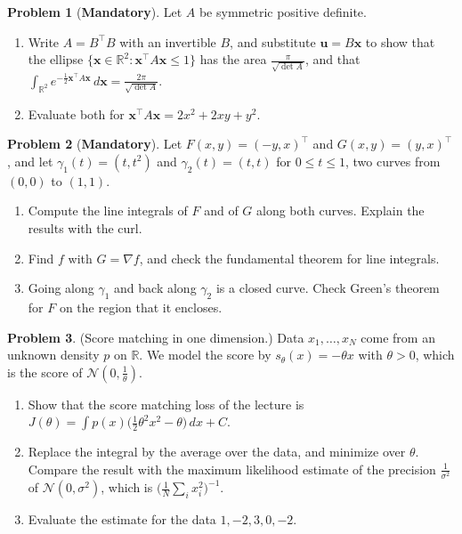 \documentclass[11pt]{article}
\theoremstyle{definition}
\newtheorem{problem}{Problem}[section]
\newcommand{\mandatory}{\textcolor{red!70!black}{\textbf{Mandatory}}}
\begin{document}
\begin{problem}[\mandatory]\label{pr:gauss-ellipse}
    Let $A$ be symmetric positive definite.
    \begin{enumerate}[label=(\alph*)]
        \item Write $A = B^\top B$ with an invertible $B$, and substitute $\mathbf{u} = B\mathbf{x}$ to show that the ellipse $\{\mathbf{x} \in \mathbb{R}^2 : \mathbf{x}^\top A\mathbf{x} \leq 1\}$ has the area $\frac{\pi}{\sqrt{\det A}}$, and that $\int_{\mathbb{R}^2} e^{-\frac{1}{2}\mathbf{x}^\top A\mathbf{x}}\, d\mathbf{x} = \frac{2\pi}{\sqrt{\det A}}$.
        \item Evaluate both for $\mathbf{x}^\top A\mathbf{x} = 2x^2 + 2xy + y^2$.
    \end{enumerate}
\end{problem}

\begin{problem}[\mandatory]\label{pr:line-integrals}
    Let $F(x, y) = (-y, x)^\top$ and $G(x, y) = (y, x)^\top$, and let $\gamma_1(t) = (t, t^2)$ and $\gamma_2(t) = (t, t)$ for $0 \leq t \leq 1$, two curves from $(0, 0)$ to $(1, 1)$.
    \begin{enumerate}[label=(\alph*)]
        \item Compute the line integrals of $F$ and of $G$ along both curves. Explain the results with the curl.
        \item Find $f$ with $G = \nabla f$, and check the fundamental theorem for line integrals.
        \item Going along $\gamma_1$ and back along $\gamma_2$ is a closed curve. Check Green's theorem for $F$ on the region that it encloses.
    \end{enumerate}
\end{problem}

\begin{problem}\label{pr:score-matching-1d}
    (Score matching in one dimension.) Data $x_1, \ldots, x_N$ come from an unknown density $p$ on $\mathbb{R}$. We model the score by $s_\theta(x) = -\theta x$ with $\theta > 0$, which is the score of $\mathcal{N}(0, \frac{1}{\theta})$.
    \begin{enumerate}[label=(\alph*)]
        \item Show that the score matching loss of the lecture is $J(\theta) = \int p(x)\big(\frac{1}{2}\theta^2x^2 - \theta\big)\, dx + C$.
        \item Replace the integral by the average over the data, and minimize over $\theta$. Compare the result with the maximum likelihood estimate of the precision $\frac{1}{\sigma^2}$ of $\mathcal{N}(0, \sigma^2)$, which is $\big(\frac{1}{N}\sum_i x_i^2\big)^{-1}$.
        \item Evaluate the estimate for the data $1, -2, 3, 0, -2$.
    \end{enumerate}
\end{problem}
\end{document}

